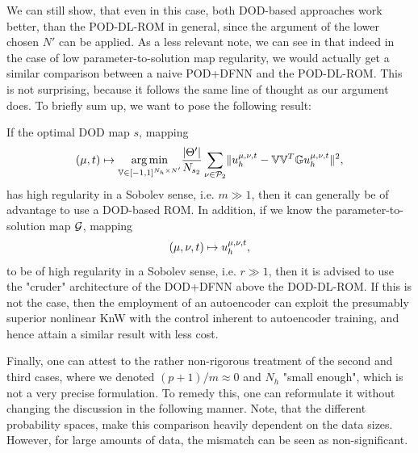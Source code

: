 We can still show, that even in this case, both DOD-based approaches work better, than the POD-DL-ROM in general,
since the argument of the lower chosen $N'$ can be applied. 
As a less relevant note, we can see in \cite[p.32-33]{brivio2023} that indeed in the case of low
parameter-to-solution map regularity, we would actually get a similar comparison between a naive POD+DFNN and the 
POD-DL-ROM. This is not surprising, because it follows the same line of thought as our argument does. 
To briefly sum up, 
we want to pose the following result:

If the optimal DOD map $s$, mapping
\begin{equation*}
    (\mu, t) \mapsto \underset{\mathbb{V} \in [-1, 1]^{N_h \times N'}}{\operatorname{arg \, min}} 
    \frac{\lvert \Theta' \rvert}{N_{s_2}} \sum_{\nu \in \mathcal{P}_2} \lVert u_h^{\mu, \nu, t} - \mathbb{V} \mathbb{V}^T \mathbb{G} u_h^{\mu, \nu, t} \rVert^2,
\end{equation*}
has high regularity in a Sobolev sense, i.e. $m \gg 1$, then it can generally be of advantage to
use a DOD-based ROM. In addition, if we know the parameter-to-solution map $\mathcal{G}$, mapping
\begin{equation*}
    (\mu, \nu, t) \mapsto u_h^{\mu, \nu, t},
\end{equation*}
to be of high regularity in a Sobolev sense, i.e. $r \gg 1$, then it is advised to use the "cruder" architecture
of the DOD+DFNN above the DOD-DL-ROM. If this is not the case, then the employment of an autoencoder
can exploit the presumably superior nonlinear KnW with the control inherent to autoencoder training, and hence
attain a similar result with less cost.

Finally, one can attest to the rather non-rigorous treatment of the second and third cases, where we
denoted $(p+1)/m \approx 0$ and $N_h$ "small enough", 
which is not a very precise formulation. To remedy this, one can reformulate
it without changing the discussion in the following manner. Note, that the different 
probability spaces, make this comparison heavily dependent on the data sizes. However, for large
amounts of data, the mismatch can be seen as non-significant.

